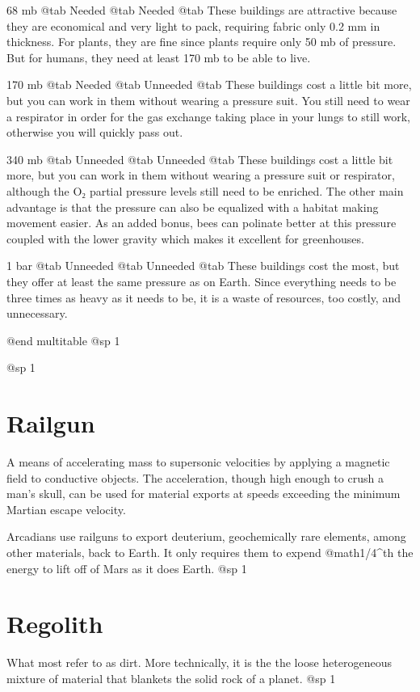 \item68 mb
@tab Needed
@tab Needed
@tab These buildings are attractive because they are economical and very light to pack, requiring fabric only 0.2 mm in thickness. For plants, they are fine since plants require only 50 mb of pressure. But for humans, they need at least 170 mb to be able to live.

\item170 mb
@tab Needed
@tab Unneeded
@tab These buildings cost a little bit more, but you can work in them without wearing a pressure suit. You still need to wear a respirator in order for the gas exchange taking place in your lungs to still work, otherwise you will quickly pass out.

\item340 mb
@tab Unneeded
@tab Unneeded
@tab These buildings cost a little bit more, but you can work in them without wearing a pressure suit or respirator, although the O₂ partial pressure levels still need to be enriched. The other main advantage is that the pressure can also be equalized with a habitat making movement easier. As an added bonus, bees can polinate better at this pressure coupled with the lower gravity which makes it excellent for greenhouses.

\item1 bar
@tab Unneeded
@tab Unneeded
@tab These buildings cost the most, but they offer at least the same pressure as on Earth. Since everything needs to be three times as heavy as it needs to be, it is a waste of resources, too costly, and unnecessary.

@end multitable
@sp 1

@sp 1

\section{Railgun}
A means of accelerating mass to supersonic velocities by applying a magnetic field to conductive objects. The acceleration, though high enough to crush a man's skull, can be used for material exports at speeds exceeding the minimum Martian escape velocity.

Arcadians use railguns to export deuterium, geochemically rare elements, among other materials, back to Earth. It only requires them to expend @math{{1/4}^{th}} the energy to lift off of Mars as it does Earth.
@sp 1

\section{Regolith}
What most refer to as dirt. More technically, it is the the loose heterogeneous mixture of material that blankets the solid rock of a planet.
@sp 1

